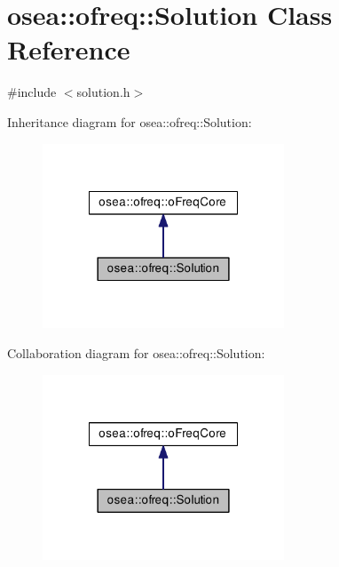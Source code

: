 \hypertarget{classosea_1_1ofreq_1_1_solution}{\section{osea\-:\-:ofreq\-:\-:Solution Class Reference}
\label{classosea_1_1ofreq_1_1_solution}
}


{\ttfamily \#include $<$solution.\-h$>$}



Inheritance diagram for osea\-:\-:ofreq\-:\-:Solution\-:\nopagebreak
\begin{figure}[H]
\begin{center}
\leavevmode
\includegraphics[width=204pt]{classosea_1_1ofreq_1_1_solution__inherit__graph}
\end{center}
\end{figure}


Collaboration diagram for osea\-:\-:ofreq\-:\-:Solution\-:\nopagebreak
\begin{figure}[H]
\begin{center}
\leavevmode
\includegraphics[width=204pt]{classosea_1_1ofreq_1_1_solution__coll__graph}
\end{center}
\end{figure}
